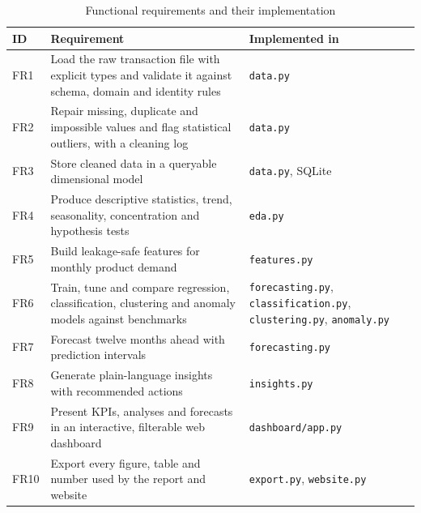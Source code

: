 \begin{table}[htbp]\centering\small
\caption{Functional requirements and their implementation}\label{tab:funreq}
\begin{tabularx}{\linewidth}{@{}lX>{\raggedright\arraybackslash}p{3.7cm}@{}}
\toprule
\textbf{ID} & \textbf{Requirement} & \textbf{Implemented in} \\ \midrule
FR1 & Load the raw transaction file with explicit types and validate it against schema, domain and identity rules & \texttt{data.py} \\
FR2 & Repair missing, duplicate and impossible values and flag statistical outliers, with a cleaning log & \texttt{data.py} \\
FR3 & Store cleaned data in a queryable dimensional model & \texttt{data.py}, SQLite \\
FR4 & Produce descriptive statistics, trend, seasonality, concentration and hypothesis tests & \texttt{eda.py} \\
FR5 & Build leakage-safe features for monthly product demand & \texttt{features.py} \\
FR6 & Train, tune and compare regression, classification, clustering and anomaly models against benchmarks & \texttt{forecasting.py}, \texttt{classification.py}, \texttt{clustering.py}, \texttt{anomaly.py} \\
FR7 & Forecast twelve months ahead with prediction intervals & \texttt{forecasting.py} \\
FR8 & Generate plain-language insights with recommended actions & \texttt{insights.py} \\
FR9 & Present KPIs, analyses and forecasts in an interactive, filterable web dashboard & \texttt{dashboard/app.py} \\
FR10 & Export every figure, table and number used by the report and website & \texttt{export.py}, \texttt{website.py} \\ \bottomrule
\end{tabularx}
\end{table}

